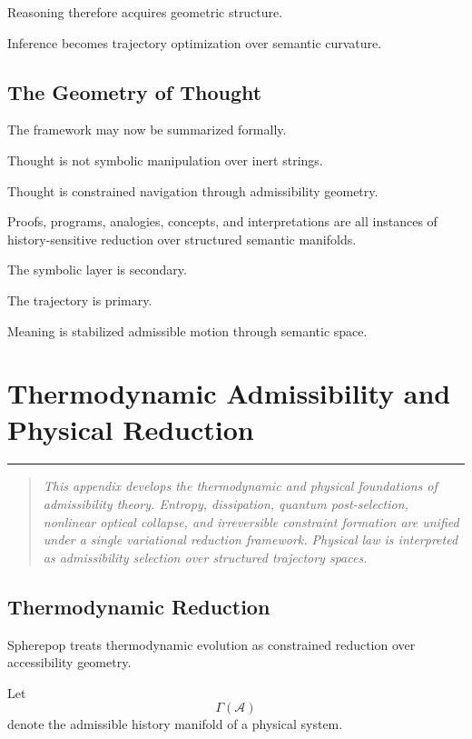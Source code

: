 \documentclass[12pt,openany]{book}
\theoremstyle{plain}
\theoremstyle{definition}
\theoremstyle{remark}
\newcommand{\chapterrule}{%
  \vspace{4pt}%
  {\color{SpherepopBlue}\rule{\textwidth}{0.8pt}}%
  \vspace{10pt}%
}
\newenvironment{chapterprecis}{%
  \begin{quote}\small\itshape}{%
  \end{quote}\medskip}
\begin{document}
Reasoning therefore acquires geometric structure.

Inference becomes trajectory optimization over semantic
curvature.

\section{The Geometry of Thought}

The framework may now be summarized formally.

Thought is not symbolic manipulation over inert strings.

Thought is constrained navigation through admissibility geometry.

Proofs, programs, analogies, concepts, and interpretations are
all instances of history-sensitive reduction over structured
semantic manifolds.

The symbolic layer is secondary.

The trajectory is primary.

Meaning is stabilized admissible motion through semantic space.


\chapter{Thermodynamic Admissibility and Physical Reduction}
\chapterrule

\begin{chapterprecis}
This appendix develops the thermodynamic and physical foundations
of admissibility theory. Entropy, dissipation, quantum
post-selection, nonlinear optical collapse, and irreversible
constraint formation are unified under a single variational
reduction framework. Physical law is interpreted as admissibility
selection over structured trajectory spaces.
\end{chapterprecis}

\section{Thermodynamic Reduction}

Spherepop treats thermodynamic evolution as constrained reduction
over accessibility geometry.

Let
\[
\Gamma(\mathcal{A})
\]
denote the admissible history manifold of a physical system.
\end{document}
